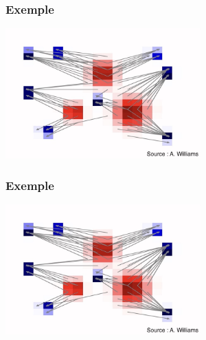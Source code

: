 \documentclass[9pt]{beamer}
\begin{document}
\begin{frame}
\frametitle{\bf Exemple}
 
\centering \includegraphics[height=5.0cm]{ex3}

\end{frame}

\begin{frame}
\frametitle{\bf Exemple}
 
\centering \includegraphics[height=5.0cm]{ex3}

\end{frame}

\end{document}

